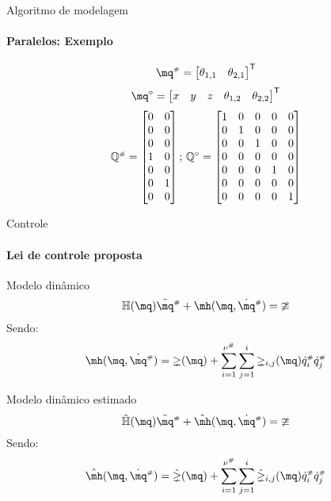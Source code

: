 \documentclass[25pt,landscape]{beamer}
\begin{document}
\begin{frame}{Algoritmo de modelagem}
    \framesubtitle{Paralelos: Exemplo}
    $$ \mq\ssh = 
		\begin{bmatrix}
			\theta_{1,1} &
			\theta_{2,1} 
		\end{bmatrix}^\msT
	$$
	$$ \mq\cir = 
		\begin{bmatrix}
			x &
			y &
			z &
			\theta_{1,2} &
			\theta_{2,2} 
		\end{bmatrix}^\msT
	$$
	\pause
	$$ \mathbb{Q}^{\scriptscriptstyle \#} =
		\begin{bmatrix}
			0 & 0 \\
			0 & 0 \\
			0 & 0 \\
			1 & 0 \\
			0 & 0 \\
			0 & 1 \\
			0 & 0 \\
		\end{bmatrix}; \,
		\mathbb{Q}^{\scriptstyle \circ} =
		\begin{bmatrix}
			1 & 0 & 0 & 0 & 0 \\
			0 & 1 & 0 & 0 & 0 \\
			0 & 0 & 1 & 0 & 0 \\
			0 & 0 & 0 & 0 & 0 \\
			0 & 0 & 0 & 1 & 0 \\
			0 & 0 & 0 & 0 & 0 \\
			0 & 0 & 0 & 0 & 1 \\
		\end{bmatrix} $$
\end{frame}

\begin{frame}{Controle}
    \framesubtitle{Lei de controle proposta}
    \pause
    \begin{block}{Modelo din\^amico}
    	$$ \mH(\mq)  \ddot{\mq}\ssh + \mh(\mq,\dot{\mq}\ssh) = \mup $$
    	Sendo:
    	$$ \mh(\mq,\dot{\mq}\ssh) = \mgamma(\mq) + \sum_{i=1}^{\nu\ssh} \sum_{j=1}^i \mgamma_{i,j}(\mq) \dot{q}\ssh_i \dot{q}\ssh_j $$
    \end{block}
    \pause
   	\begin{block}{Modelo din\^amico estimado}
    	$$ \hat{\mH}(\mq)  \ddot{\mq}\ssh + \hat{\mh}(\mq,\dot{\mq}\ssh) = \mup $$
    	Sendo:
    	$$ \hat{\mh}(\mq,\dot{\mq}\ssh) = \hat{\mgamma}(\mq) + \sum_{i=1}^{\nu\ssh} \sum_{j=1}^i \hat{\mgamma}_{i,j}(\mq) \dot{q}\ssh_i \dot{q}\ssh_j $$
   	\end{block}
\end{frame}
\end{document}
